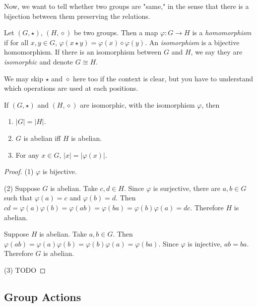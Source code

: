     Now, we want to tell whether two groups are "same," in the sense that there is a bijection between them preserving the relations.
    
    \begin{defn} \label{def_group_homomorphism}
        Let $(G,\star)$, $(H,\diamond)$ be two groups. Then a map $\varphi: G \to H$ is a \emph{homomorphism} if for all $x,y \in G$, $\varphi(x \star y)=\varphi(x) \diamond \varphi(y)$. An \emph{isomorphism} is a bijective homomorphism. If there is an isomorphism between $G$ and $H$, we say they are \emph{isomorphic} and denote $G \cong H$.
    \end{defn}
    
    We may skip $\star$ and $\diamond$ here too if the context is clear, but you have to understand which operations are used at each positions.
    
    \begin{thm} \label{thm_isomorphic_groups}
        If $(G,\star)$ and $(H,\diamond)$ are isomorphic, with the isomorphism $\varphi$, then \begin{enumerate}
            \item $|G| = |H|$.
            \item $G$ is abelian iff $H$ is abelian.
            \item For any $x \in G$, $|x| = |\varphi(x)|$.
        \end{enumerate}
    \end{thm}
    
    \begin{proof}
    (1) $\varphi$ is bijective.
    
    (2) Suppose $G$ is abelian. Take $c,d \in H$. Since $\varphi$ is surjective, there are $a,b \in G$ such that $\varphi(a) = c$ and $\varphi(b) = d$. Then $cd = \varphi(a)\varphi(b) = \varphi(ab) = \varphi(ba) = \varphi(b)\varphi(a) = dc$. Therefore $H$ is abelian.
    
    Suppose $H$ is abelian. Take $a,b \in G$. Then $\varphi(ab) = \varphi(a)\varphi(b) = \varphi(b)\varphi(a) = \varphi(ba)$. Since $\varphi$ is injective, $ab = ba$. Therefore $G$ is abelian.
    
    (3) TODO
    \end{proof}
    
    \subsection{Group Actions}
    

